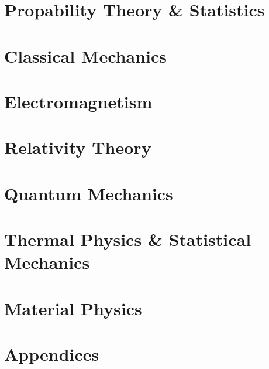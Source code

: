 \documentclass[12pt]{report}
\begin{document}
\part{Propability Theory \& Statistics}




\part{Classical Mechanics}



%
%
%

\part{Electromagnetism}




\part{Relativity Theory}


\part{Quantum Mechanics}









\part{Thermal Physics \& Statistical Mechanics}%
%
%
%

\part{Material Physics}%
%

\part{Appendices}
\begin{appendices}



\end{appendices}
\end{document}
